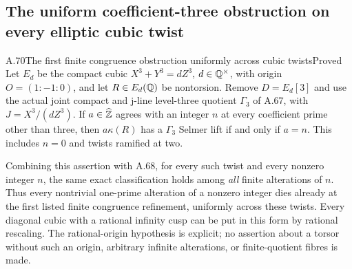 \subsection{The uniform coefficient-three obstruction on every elliptic cubic twist}

\begin{statement}{A.70}{The first finite congruence obstruction uniformly across cubic twists}{Proved}
Let $E_d$ be the compact cubic
$X^3+Y^3=dZ^3$, $d\in\mathbb Q^\times$, with origin
$O=(1:-1:0)$, and let $R\in E_d(\mathbb Q)$ be nontorsion.
Remove $D=E_d[3]$ and use the actual joint compact and
j-line level-three quotient $\Gamma_3$ of A.67, with
$J=X^3/(dZ^3)$.
If $a\in\widehat{\mathbb Z}$ agrees with an integer $n$ at
every coefficient prime other than three, then
$a\kappa(R)$ has a $\Gamma_3$ Selmer lift if and only
if $a=n$. This includes $n=0$ and twists ramified at two.

Combining this assertion with A.68, for every such
twist and every nonzero integer $n$, the same exact
classification holds among \emph{all} finite alterations
of $n$. Thus every nontrivial one-prime alteration
of a nonzero integer dies already at the first listed
finite congruence refinement, uniformly across these
twists. Every diagonal cubic with a rational infinity
cusp can be put in this form by rational rescaling.
The rational-origin hypothesis is explicit; no
assertion about a torsor without such an origin,
arbitrary infinite alterations, or finite-quotient
fibres is made.
\end{statement}
